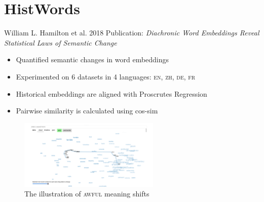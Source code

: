 \documentclass[10pt]{beamer}
\begin{document}
\section{HistWords}
\begin{frame}{William L. Hamilton et al. 2018}
    Publication: \textit{Diachronic Word Embeddings Reveal Statistical Laws of Semantic Change}
    \begin{itemize}
        \item Quantified semantic changes in word embeddings
        \item Experimented on 6 datasets in 4 languages: \textsc{en, zh, de, fr}
        \item Historical embeddings are aligned with Proscrutes Regression
        \item Pairwise similarity is calculated using cos-sim
    \end{itemize}
    \begin{figure}
        \centering
        \includegraphics[width=0.6\textwidth]{figures/histwords awful 02.png}
        \caption{The illustration of \textsc{awful} meaning shifts}
        \label{fig:histwords_awful_02}
    \end{figure}
\end{frame}
\end{document}
